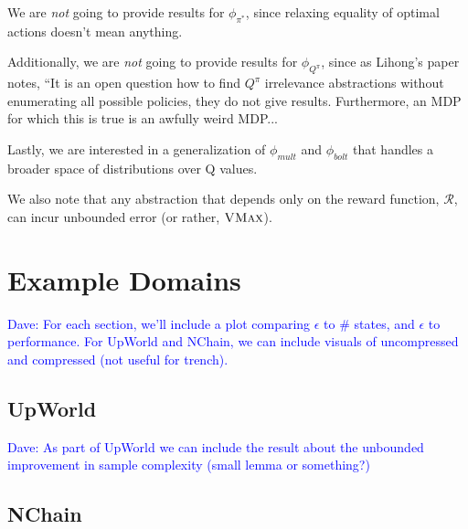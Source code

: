 \documentclass{article}
\newcommand\dnote[1]{\textcolor{blue}{Dave: #1}}
\begin{document}
We are {\it not} going to provide results for $\phi_{\pi^*}$, since relaxing equality of optimal actions doesn't mean anything.

Additionally, we are {\it not} going to provide results for $\phi_{Q^\pi}$, since as Lihong's paper notes, ``It is an open question how to find $Q^\pi$ irrelevance abstractions without enumerating all possible policies, they do not give results. Furthermore, an MDP for which this is true is an awfully weird MDP...

Lastly, we are interested in a generalization of $\phi_{mult}$  and $\phi_{bolt}$ that handles a broader space of distributions over Q values.

We also note that any abstraction that depends only on the reward function, $\mathcal{R}$, can incur unbounded error (or rather, $\textsc{VMax}$).




\section{Example Domains}

\dnote{For each section, we'll include a plot comparing $\epsilon$ to \# states, and $\epsilon$ to performance. For UpWorld and NChain, we can include visuals of uncompressed and compressed (not useful for trench).}

\subsection{UpWorld}

\dnote{As part of UpWorld we can include the result about the unbounded improvement in sample complexity (small lemma or something?)}



\subsection{NChain}

\end{document}
